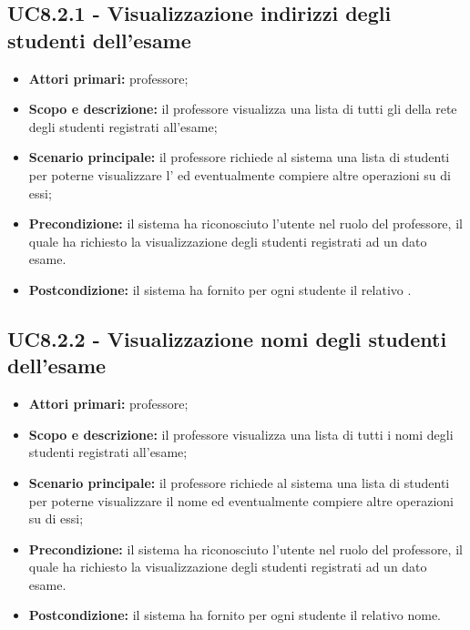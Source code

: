 \documentclass[AnalisiDeiRequisiti.tex]{subfiles}
\begin{document}
\subsection{UC8.2.1 - Visualizzazione indirizzi degli studenti dell'esame}
\begin{itemize}
	\item \textbf{Attori primari:} professore;
	\item \textbf{Scopo e descrizione:} il professore visualizza una lista di tutti gli  della rete  degli studenti registrati all'esame;
	\item \textbf{Scenario principale:} il professore richiede al sistema una lista di studenti per poterne visualizzare l' ed eventualmente compiere altre operazioni su di essi;
	\item \textbf{Precondizione:} il sistema ha riconosciuto l'utente nel ruolo del professore, il quale ha richiesto la visualizzazione degli studenti registrati ad un dato esame.
	\item \textbf{Postcondizione:} il sistema ha fornito per ogni studente il relativo .
\end{itemize}
\subsection{UC8.2.2 - Visualizzazione nomi degli studenti dell'esame}
\begin{itemize}
	\item \textbf{Attori primari:} professore;
	\item \textbf{Scopo e descrizione:} il professore visualizza una lista di tutti i nomi degli studenti registrati all'esame;
	\item \textbf{Scenario principale:} il professore richiede al sistema una lista di studenti per poterne visualizzare il nome ed eventualmente compiere altre operazioni su di essi;
	\item \textbf{Precondizione:} il sistema ha riconosciuto l'utente nel ruolo del professore, il quale ha richiesto la visualizzazione degli studenti registrati ad un dato esame.
	\item \textbf{Postcondizione:} il sistema ha fornito per ogni studente il relativo nome.
\end{itemize}
\end{document}
